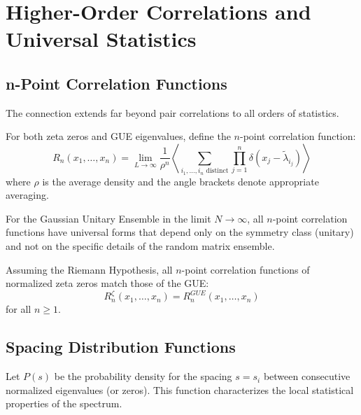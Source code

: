 \section{Higher-Order Correlations and Universal Statistics}
\label{sec:higher_correlations}

\subsection{n-Point Correlation Functions}

The connection extends far beyond pair correlations to all orders of statistics.

\begin{definition}
\label{def:n_point_correlation}
For both zeta zeros and GUE eigenvalues, define the $n$-point correlation function:
\begin{equation}
R_n(x_1, \ldots, x_n) = \lim_{L \to \infty} \frac{1}{\rho^n} \left\langle \sum_{i_1, \ldots, i_n \text{ distinct}} \prod_{j=1}^n \delta(x_j - \tilde{\lambda}_{i_j}) \right\rangle
\end{equation}
where $\rho$ is the average density and the angle brackets denote appropriate averaging.
\end{definition}

\begin{theorem}
\label{thm:gue_universality}
For the Gaussian Unitary Ensemble in the limit $N \to \infty$, all $n$-point correlation functions have universal forms that depend only on the symmetry class (unitary) and not on the specific details of the random matrix ensemble.
\end{theorem}

\begin{conjecture}
\label{conj:zeta_gue}
Assuming the Riemann Hypothesis, all $n$-point correlation functions of normalized zeta zeros match those of the GUE:
\begin{equation}
R_n^{\zeta}(x_1, \ldots, x_n) = R_n^{GUE}(x_1, \ldots, x_n)
\end{equation}
for all $n \geq 1$.
\end{conjecture}

\subsection{Spacing Distribution Functions}

\begin{definition}
\label{def:spacing_distribution}
Let $P(s)$ be the probability density for the spacing $s = s_i$ between consecutive normalized eigenvalues (or zeros). This function characterizes the local statistical properties of the spectrum.
\end{definition}

